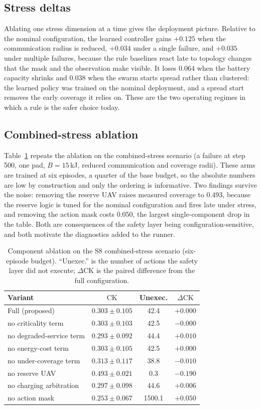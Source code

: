 \documentclass[conference]{IEEEtran}
\newcommand{\ck}{\mathrm{CK}}
\begin{document}
\subsection{Stress deltas}
Ablating one stress dimension at a time gives the deployment picture. Relative to the nominal configuration, the learned controller gains $+0.125$ when the communication radius is reduced, $+0.034$ under a single failure, and $+0.035$ under multiple failures, because the rule baselines react late to topology changes that the mask and the observation make visible. It loses $0.064$ when the battery capacity shrinks and $0.038$ when the swarm starts spread rather than clustered: the learned policy was trained on the nominal deployment, and a spread start removes the early coverage it relies on. These are the two operating regimes in which a rule is the safer choice today.

\subsection{Combined-stress ablation}
Table~\ref{tab:ablstress} repeats the ablation on the combined-stress scenario (a failure at step 500, one pad, $B=15$\,kJ, reduced communication and coverage radii). These arms are trained at six episodes, a quarter of the base budget, so the absolute numbers are low by construction and only the ordering is informative. Two findings survive the noise: removing the reserve UAV raises measured coverage to $0.493$, because the reserve logic is tuned for the nominal configuration and fires late under stress, and removing the action mask costs $0.050$, the largest single-component drop in the table. Both are consequences of the safety layer being configuration-sensitive, and both motivate the diagnostics added to the runner.

\begin{table}[t]
\caption{Component ablation on the S8 combined-stress scenario (six-episode budget). ``Unexec.'' is the number of actions the safety layer did not execute; $\Delta\ck$ is the paired difference from the full configuration.}
\label{tab:ablstress}
\centering
\small
\setlength{\tabcolsep}{3pt}
\begin{tabular}{@{}lccc@{}}
\toprule
Variant & $\ck$ & Unexec. & $\Delta\ck$ \\
\midrule
Full (proposed) & $0.303\pm0.105$ & 42.4 & $+0.000$ \\
no criticality term & $0.303\pm0.103$ & 42.5 & $-0.000$ \\
no degraded-service term & $0.293\pm0.092$ & 44.4 & $+0.010$ \\
no energy-cost term & $0.303\pm0.105$ & 42.5 & $+0.000$ \\
no under-coverage term & $0.313\pm0.117$ & 38.8 & $-0.010$ \\
no reserve UAV & $0.493\pm0.021$ & 0.3 & $-0.190$ \\
no charging arbitration & $0.297\pm0.098$ & 44.6 & $+0.006$ \\
no action mask & $0.253\pm0.067$ & 1500.1 & $+0.050$ \\
\bottomrule
\end{tabular}
\end{table}
\end{document}
